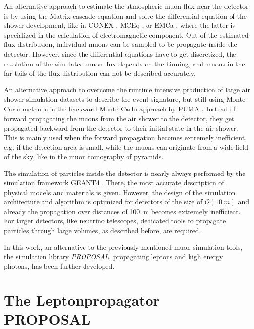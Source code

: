 An alternative approach to estimate the atmospheric muon flux near the detector is by using the Matrix cascade equation and solve the differential equation of the shower development, like in CONEX \cite{Bergmann07CONEX}, MCEq \cite{Fedynitch15MCEq}, or EMCa \cite{MeighenBerger19EMCa, MeighenBerger19ICRC}, where the latter is specialized in the calculation of electromagnetic component.
Out of the estimated flux distribution, individual muons can be sampled to be propagate inside the detector.
However, since the differential equations have to get discretized, the resolution of the simulated muon flux depends on the binning, and muons in the far tails of the flux distribution can not be described accurately.

An alternative approach to overcome the runtime intensive production of large air shower simulation datasets to describe the event signature, but still using Monte-Carlo methods is the backward Monte-Carlo approach by PUMA \cite{Niess17}.
Instead of forward propagating the muons from the air shower to the detector, they get propagated backward from the detector to their initial state in the air shower.
This is mainly used when the forward propagation becomes extremely inefficient, e.g. if the detection area is small, while the muons can originate from a wide field of the sky, like in the muon tomography of pyramids.

The simulation of particles inside the detector is nearly always performed by the simulation framework GEANT4 \cite{Agostinelli03, Allison06, Allison16, GEANT4}.
There, the most accurate description of physical models and materials is given.
However, the design of the simulation architecture and algorithm is optimized for detectors of the size of $\mathcal{O}(\SI{10}{m})$ and already the propagation over distances of \SI{100}{m} becomes extremely inefficient.
For larger detectors, like neutrino telescopes, dedicated tools to propagate particles through large volumes, as described before, are required.

In this work, an alternative to the previously mentioned muon simulation tools, the simulation library \textit{PROPOSAL}, propagating leptons and high energy photons, has been further developed.

%

\section{The Leptonpropagator PROPOSAL}

